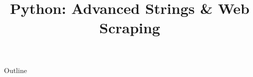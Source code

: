 \documentclass[xcolor=dvipsnames,compress,t,pdf]{beamer}
\title[\insertframenumber /\inserttotalframenumber]{Python: Advanced Strings \& Web Scraping}
\begin{document}
	\begin{frame}
	\titlepage
	\end{frame}

	\begin{frame}{Outline}
	    \tableofcontents
	\end{frame}

	
	
	
\end{document}
